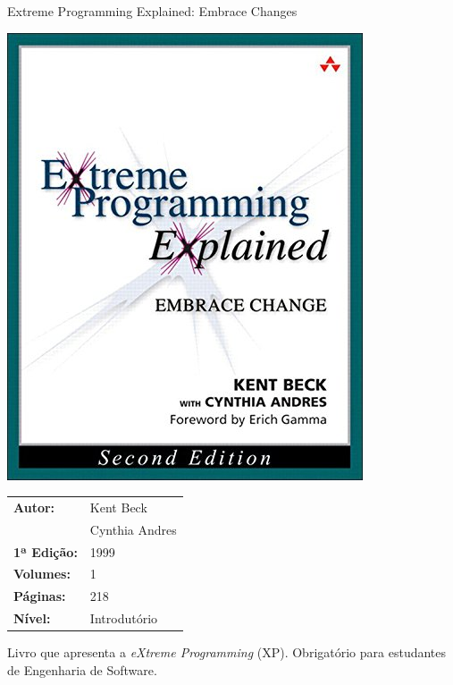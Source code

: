 \begin{frame}[fragile]{Extreme Programming Explained: Embrace Changes}

    \begin{minipage}{0.4\textwidth}
        \includegraphics[scale=0.25]{xp.jpg}
    \end{minipage}
    \begin{minipage}{0.5\textwidth}
        \begin{small}
            \begin{tabularx}{0.95\textwidth}{lX}
                \textbf{Autor:} & Kent Beck \\
                & Cynthia Andres \\
                \textbf{1ª Edição:} & 1999 \\
                \textbf{Volumes:} & 1 \\
                \textbf{Páginas:} & 218 \\
                \textbf{Nível:} & Introdutório \\
            \end{tabularx}
        \end{small}
    \end{minipage}

    \vspace{0.2in} 

    Livro que apresenta a \textit{eXtreme Programming} (XP). Obrigatório para estudantes de
    Engenharia de Software.

\end{frame}

